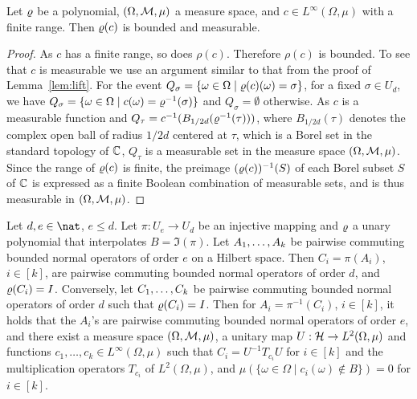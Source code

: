 \begin{lemma}\label{lem:polynomial-image}
Let $\varrho$ be a polynomial, $(\Omega,{\mathcal M},\mu)$ a measure space, and $c\in L^\infty(\Omega,\mu)$ with a finite range. Then $\varrho(c)$ is bounded and measurable.
\end{lemma}

\begin{proof}
As $c$ has a finite range, so does $\rho(c)$. Therefore $\rho(c)$ is bounded. To
see that $c$ is measurable we use an argument similar to that from the proof
of Lemma~\ref{lem:lift}. For the event $Q_\sigma = \{\omega\in\Omega\mid
  \varrho(c)(\omega) =\sigma\}$, for a fixed $\sigma\in U_d$,
we have $Q_\sigma = \{\omega\in\Omega\mid c(\omega) =\varrho^{-1}(\sigma)\}$ and $Q_\sigma=\emptyset$ otherwise. As $c$ is a measurable function and $Q_\tau = c^{-1}(B_{1/2d}(\varrho^{-1}(\tau)))$, where $B_{1/2d}(\tau)$ denotes the complex open ball of radius $1/2d$ centered
at $\tau$, which is a Borel set in the standard topology of ${\mathbb C}$, $Q_\tau$ is a measurable set in the measure space $(\Omega,{\mathcal M},\mu)$. Since the range of $\varrho(c)$ is finite, the preimage $(\varrho(c))^{-1}(S)$ of each Borel subset $S$ of ${\mathbb C}$ is expressed as a finite Boolean combination of measurable sets, and is thus measurable in $(\Omega,{\mathcal M},\mu)$.
\end{proof}

\begin{lemma}\label{lem:mapping-infinite}
Let $d,e\in\nat$, $e\le d$. 
Let $\pi:U_e\to U_d$ be an injective mapping and $\varrho$ a unary polynomial that interpolates $B=\Im(\pi)$.  Let $A _1,\ldots, A _{k}$ be pairwise commuting bounded normal operators of order $e$ on a Hilbert space. Then $C_i=\pi(A_i)$, $i\in[k]$, are pairwise commuting bounded normal operators of order $d$, and $\varrho(C_i)=I$. Conversely, let $C _1,\ldots, C _{k}$ be pairwise commuting bounded normal operators of order $d$ such that $\varrho(C_i)=I$. Then for $A_i=\pi^{-1}(C_i)$, $i\in[k]$, it holds that the $A_i$'s are pairwise commuting bounded normal operators of order $e$, and there exist a measure space $(\Omega,{\mathcal M},\mu)$, a unitary map $U:{\mathcal H}\to L^2(\Omega,\mu)$ and functions $c_1,\dots,c_k\in L^\infty(\Omega,\mu)$ such that $C_i = U^{-1} T_{c_i}U$ for $i\in [k]$ and the multiplication operators $T_{c_i}$ of $L^2(\Omega,\mu)$, and $\mu(\{\omega\in\Omega\mid c_i(\omega)\not\in B\}) = 0$ for $i\in[k]$.
\end{lemma}

